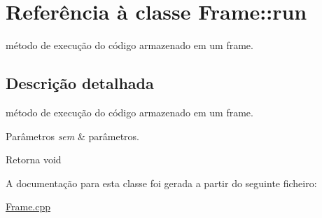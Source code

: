 \hypertarget{class_frame_1_1run}{}\section{Referência à classe Frame\+:\+:run}
\label{class_frame_1_1run}


método de execução do código armazenado em um frame.  




\subsection{Descrição detalhada}
método de execução do código armazenado em um frame. 


\begin{DoxyParams}{Parâmetros}
{\em sem} & parâmetros. \\
\hline
\end{DoxyParams}
\begin{DoxyReturn}{Retorna}
void 
\end{DoxyReturn}


A documentação para esta classe foi gerada a partir do seguinte ficheiro\+:\begin{DoxyCompactItemize}
\item 
\hyperlink{_frame_8cpp}{Frame.\+cpp}\end{DoxyCompactItemize}
